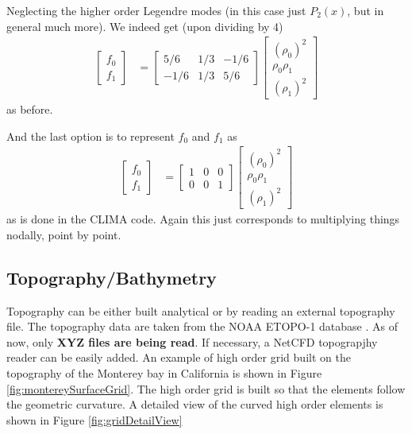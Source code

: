 \documentclass{report}
\numberwithin{equation}{section}
\begin{document}
Neglecting the higher order Legendre modes (in this case just $P_2(x)$, but in general much more). We indeed get (upon dividing by 4)
\begin{align}
        \begin{bmatrix}
    f_0 \\
    f_1
    \end{bmatrix}
    &= 
        \begin{bmatrix}
    5/6 & 1/3 & -1/6 \\
    -1/6 & 1/3 & 5/6
    \end{bmatrix}
        \begin{bmatrix}
    (\rho_0)^2 \\
    \rho_0 \rho_1 \\
    (\rho_1)^2
    \end{bmatrix}
\end{align}
as before.

And the last option is to represent $f_0$ and $f_1$ as
\begin{align}
        \begin{bmatrix}
    f_0 \\
    f_1
    \end{bmatrix}
    &= 
        \begin{bmatrix}
    1 & 0 & 0 \\
    0 & 0 & 1
    \end{bmatrix}
        \begin{bmatrix}
    (\rho_0)^2 \\
    \rho_0 \rho_1 \\
    (\rho_1)^2
    \end{bmatrix}
\end{align} 
as is done in the CLIMA code. Again this just corresponds to multiplying things nodally, point by point. 

\subsection{Topography/Bathymetry}
Topography can be either built analytical or by reading an external topography file. The topography data are taken from the NOAA ETOPO-1 database \cite{etopo1}. As of now, only {\bf XYZ files are being read}. If necessary, a NetCFD topograpjhy reader can be easily added.
An example of high order grid built on the topography of the Monterey bay in California is shown in Figure \ref{fig:montereySurfaceGrid}. The high order grid is built so that the elements follow the geometric curvature. A detailed view of the curved high order elements is shown in Figure \ref{fig:gridDetailView}
\end{document}
